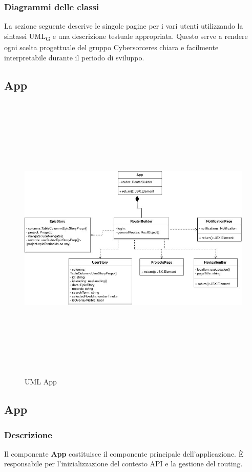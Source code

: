 \documentclass{article}
\begin{document}
\subsubsection{Diagrammi delle classi}
La sezione seguente descrive le singole pagine per i vari utenti utilizzando la sintassi UML\textsubscript{G} e una descrizione testuale appropriata. Questo serve a rendere ogni scelta progettuale del gruppo Cybersorceres chiara e facilmente interpretabile durante il periodo di sviluppo.

\subsection{App}
\begin{figure}[H]
    \centering
    \includegraphics[width=1\textwidth, height=400pt]{documenti/imgUMLFrontend/App.jpg}
    \caption{UML App}
    \label{fig:uml-App}
\end{figure}
\subsection{App}

\subsubsection*{Descrizione}
Il componente \textbf{App} costituisce il componente principale dell'applicazione. È responsabile per l'inizializzazione del contesto API e la gestione del routing.
\end{document}
